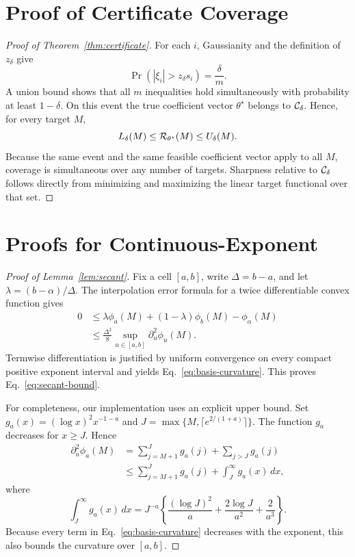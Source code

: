 \section{Proof of Certificate Coverage}

\begin{proof}[Proof of Theorem~\ref{thm:certificate}]
For each $i$, Gaussianity and the definition of $z_\delta$ give
\[
\Pr\left(|\xi_i|>z_\delta s_i\right)=\frac{\delta}{m}.
\]
A union bound shows that all $m$ inequalities hold simultaneously with probability at least $1-\delta$. On this event the true coefficient vector $\theta^\star$ belongs to $\mathcal{C}_\delta$. Hence, for every target $M$,
\[
L_\delta(M)\le\mathcal{R}_{\theta^\star}(M)\le U_\delta(M).
\]
Because the same event and the same feasible coefficient vector apply to all $M$, coverage is simultaneous over any number of targets. Sharpness relative to $\mathcal{C}_\delta$ follows directly from minimizing and maximizing the linear target functional over that set.
\end{proof}


\section{Proofs for Continuous-Exponent \ScaleCert}

\begin{proof}[Proof of Lemma~\ref{lem:secant}]
Fix a cell $[a,b]$, write $\Delta=b-a$, and let
$\lambda=(b-\alpha)/\Delta$. The interpolation error formula for a twice differentiable convex function gives
\begin{align*}
0 &\le \lambda\phi_a(M)+(1-\lambda)\phi_b(M)-\phi_\alpha(M)\\
  &\le \frac{\Delta^2}{8}
  \sup_{u\in[a,b]}\partial_u^2\phi_u(M).
\end{align*}
Termwise differentiation is justified by uniform convergence on every compact positive exponent interval and yields Eq.~\eqref{eq:basis-curvature}. This proves Eq.~\eqref{eq:secant-bound}.

For completeness, our implementation uses an explicit upper bound. Set
$g_a(x)=(\log x)^2x^{-1-a}$ and
$J=\max\{M,\lceil e^{2/(1+a)}\rceil\}$. The function $g_a$ decreases for $x\ge J$. Hence
\begin{align*}
\partial_a^2\phi_a(M)
&=\sum_{j=M+1}^{J}g_a(j)+\sum_{j>J}g_a(j)\\
&\le \sum_{j=M+1}^{J}g_a(j)+\int_J^\infty g_a(x)\,dx,
\end{align*}
where
\[
\int_J^\infty g_a(x)\,dx
=J^{-a}\left\{\frac{(\log J)^2}{a}
+\frac{2\log J}{a^2}+\frac{2}{a^3}\right\}.
\]
Because every term in Eq.~\eqref{eq:basis-curvature} decreases with the exponent, this also bounds the curvature over $[a,b]$.
\end{proof}

